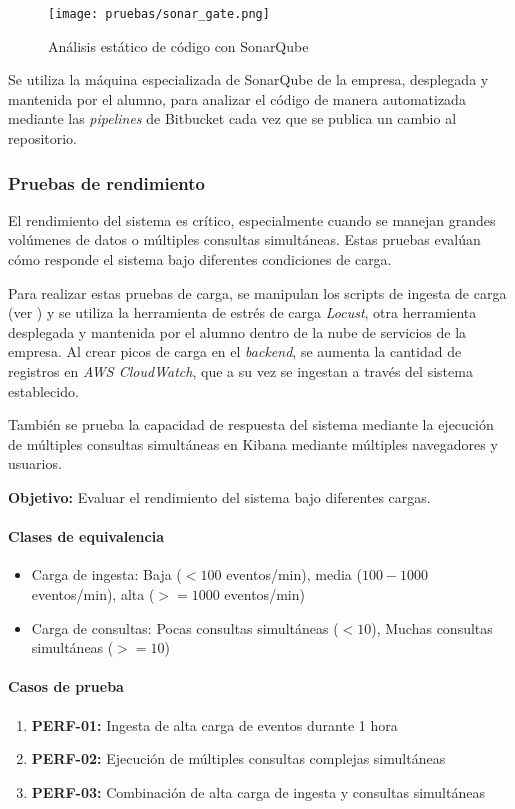 \begin{figure}[H]
	\centering
	\texttt{[image: pruebas/sonar\_gate.png]}
	\caption{Análisis estático de código con SonarQube}
	\label{fig:sonarqube}
\end{figure}

Se utiliza la máquina especializada de SonarQube de la empresa, desplegada y
mantenida por el alumno, para analizar el código de manera automatizada mediante
las \textit{pipelines} de Bitbucket cada vez que se publica un cambio al
repositorio.


\newpage{}
\subsubsection{Pruebas de rendimiento}
El rendimiento del sistema es crítico, especialmente cuando se manejan grandes
volúmenes de datos o múltiples consultas simultáneas. Estas pruebas evalúan
cómo responde el sistema bajo diferentes condiciones de carga.

Para realizar estas pruebas de carga, se manipulan los scripts de ingesta de
carga (ver ) y se utiliza la herramienta de estrés de
carga \textit{Locust}, otra herramienta desplegada y mantenida por el alumno
dentro de la nube de servicios de la empresa. Al crear picos de carga en el
\textit{backend}, se aumenta la cantidad de registros en \textit{AWS CloudWatch},
que a su vez se ingestan a través del sistema establecido.

También se prueba la capacidad de respuesta del sistema mediante la ejecución
de múltiples consultas simultáneas en Kibana mediante múltiples navegadores y
usuarios.

\textbf{Objetivo:} Evaluar el rendimiento del sistema bajo diferentes cargas.

\paragraph{Clases de equivalencia}

\begin{itemize}
    \item Carga de ingesta: Baja ($<100$ eventos/min), media ($100-1000$ eventos/min),
    	alta ($>=1000$ eventos/min)
    \item Carga de consultas: Pocas consultas simultáneas ($<10$), Muchas
    consultas simultáneas ($>=10$)
\end{itemize}

\paragraph{Casos de prueba}
\begin{enumerate}
    \item \textbf{PERF-01:} Ingesta de alta carga de eventos durante 1 hora
    \item \textbf{PERF-02:} Ejecución de múltiples consultas complejas simultáneas
    \item \textbf{PERF-03:} Combinación de alta carga de ingesta y consultas simultáneas
\end{enumerate}


